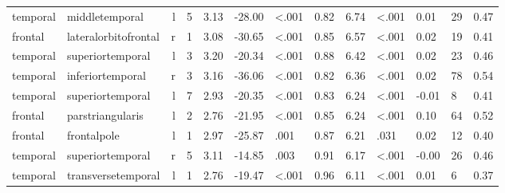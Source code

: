 \documentclass{article}
\begin{document}
\begin{longtable}{llrR{1.3cm}R{1cm}R{1.3cm}R{1cm}R{1cm}R{1.3cm}R{1cm}R{1.8cm}R{1.3cm}R{1.8cm}}
  temporal &            middletemporal &    l &         5 &                  3.13 &           -28.00 &      \textless.001 &                               0.82 &                          6.74 &                   \textless.001 &   0.01 &     29 &      0.47 \\
   frontal &      lateralorbitofrontal &    r &         1 &                  3.08 &           -30.65 &      \textless.001 &                               0.85 &                          6.57 &                   \textless.001 &   0.02 &     19 &      0.41 \\
  temporal &          superiortemporal &    l &         3 &                  3.20 &           -20.34 &      \textless.001 &                               0.88 &                          6.42 &                   \textless.001 &   0.02 &     23 &      0.46 \\
  temporal &          inferiortemporal &    r &         3 &                  3.16 &           -36.06 &      \textless.001 &                               0.82 &                          6.36 &                   \textless.001 &   0.02 &     78 &      0.54 \\
  temporal &          superiortemporal &    l &         7 &                  2.93 &           -20.35 &      \textless.001 &                               0.83 &                          6.24 &                   \textless.001 &  -0.01 &      8 &      0.41 \\
   frontal &          parstriangularis &    l &         2 &                  2.76 &           -21.95 &      \textless.001 &                               0.85 &                          6.24 &                   \textless.001 &   0.10 &     64 &      0.52 \\
   frontal &               frontalpole &    l &         1 &                  2.97 &           -25.87 &               .001 &                               0.87 &                          6.21 &                            .031 &   0.02 &     12 &      0.40 \\
  temporal &          superiortemporal &    r &         5 &                  3.11 &           -14.85 &               .003 &                               0.91 &                          6.17 &                   \textless.001 &  -0.00 &     26 &      0.46 \\
  temporal &        transversetemporal &    l &         1 &                  2.76 &           -19.47 &      \textless.001 &                               0.96 &                          6.11 &                   \textless.001 &   0.01 &      6 &      0.37 \\

\end{longtable}
\end{document}
